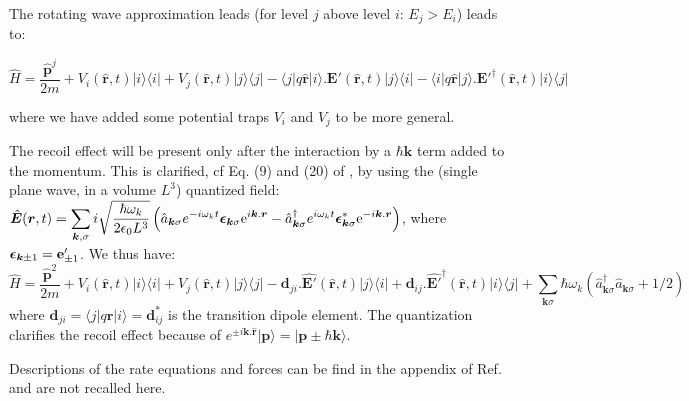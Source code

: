 \documentclass[amsmath,amssymb,nofootinbib]{revtex4-2}
\begin{document}
	 		 		 	 
The rotating wave approximation leads (for level $j$ above level $i$: $E_j>E_i$) leads to:
	 	
	 	\begin{equation*}
	 	\hat H =  \frac{\bm \hat {\bm p}^j}{2 m} + 
	 	V_i(\hat {\bm r},t) |i\rangle\langle i| + V_j(\hat {\bm r},t) |j\rangle \langle j| 
	 	-   \langle j | q \hat {\bm r}| i \rangle .\bm E' (\hat {\bm r} ,t)  |j\rangle \langle i| -  \langle i | q \hat {\bm r}| j \rangle .  \bm E'^\dag (\hat {\bm r} ,t)  |i\rangle \langle j| \label{hamiltonianRWA}
	 	\end{equation*}
	 
	 	where we have added some  potential traps $V_i$ and $V_j$ to be more general.
	 	
	 	The recoil effect will be present only after the interaction by a $\hbar \bm k$ term added to the momentum. This is clarified, cf Eq. (9) and (20) of \cite{chaneliere2018phase}, by using the (single plane wave, in a volume $L^3$)
 quantized field:
	 	$\displaystyle	\hat{\bm{E}} (\bm{r},t)  = \sum_{\bm{k},\sigma} i \sqrt{\frac{ \hbar  \omega_k}{2  \epsilon_0 L^3} } \left(  \hat a_{\bm{k} \sigma} e^{- i \omega_k t}  \bm{\epsilon}_{\bm{k}\sigma} {\rm e}^{i \bm{k}.\bm{r} }  - \hat a_{\bm{k} \sigma}^\dag  e^{ i \omega_k t}  \bm{\epsilon}_{\bm{k}\sigma}^\ast {\rm e}^{-i \bm{k}.\bm{r} } \right)$, where $ {\bm \epsilon}_{\bm k \pm 1} =  {\bf e}'_{\pm 1}$.  We thus have:
	 	\begin{equation*}
	 	\hat H =  \frac{\hat{\bm p}^2}{2 m} + 
	 	V_i(\hat{\bm r},t) |i\rangle\langle i| + V_j(\hat{\bm r},t) |j\rangle \langle j| \label{eq_base_at}
	 	-  \bm d_{ji}. \hat{\bm E'} (\hat{\bm r} ,t)    |j\rangle \langle i| + \bm d_{ij} .{\hat{\bm E'}}^\dag (\hat{\bm r} ,t)  |i\rangle \langle j|  +
	 	\sum_{\bm{k} \sigma} \hbar \omega_k \left( \hat a^\dag_{\bm{k} \sigma} \hat a_{\bm{k} \sigma} + 1/2 \right) 
	 	\end{equation*}
	 	where  $\bm d_{ji} = \langle j | q \hat {\bm r}| i \rangle = \bm d_{ij}^* $ is the transition dipole element. The quantization  clarifies  the recoil effect because of
	 	$
	 	e^{ \pm i \bm k.\hat{\bm r}} | \bm p\rangle = |\bm p \pm \hbar \bm k\rangle$.
	 
	

	Descriptions of the rate equations and forces can be find in the appendix of Ref.  \cite{comparat2014molecular,chaneliere2018phase} and are not recalled here.
	
\end{document}

